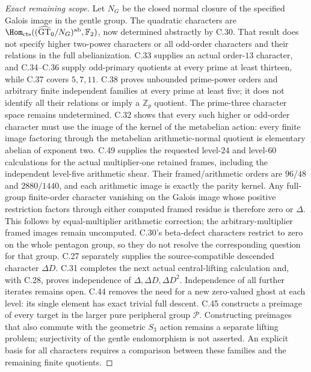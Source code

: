 \begin{proof}[Exact remaining scope]
Let $N_G$ be the closed normal closure of the specified Galois image
in the gentle group. The quadratic characters are
$\Hom_{\mathrm{cts}}((\widehat{\mathrm{GT}}_0/N_G)^{\mathrm{ab}},
\mathbb F_2)$, now determined abstractly by C.30. That result does not
specify higher two-power characters or all odd-order characters and
their relations in the full abelianization. C.33 supplies an actual
order-$13$ character, and C.34--C.36 supply odd-primary quotients
at every prime at least thirteen, while C.37 covers $5,7,11$.
C.38 proves unbounded prime-power orders and arbitrary finite
independent families at every prime at least five; it does not
identify all their relations or imply a $\mathbb Z_p$ quotient.
The prime-three character space remains undetermined.
C.32 shows that every such higher
or odd-order character must use the image of the kernel of
the metabelian action: every finite image factoring through the
metabelian arithmetic-normal quotient is elementary abelian of
exponent two. C.49 supplies the requested level-$24$ and level-$60$
calculations for the actual multiplier-one retained frames, including
the independent level-five arithmetic shear. Their framed/arithmetic
orders are $96/48$ and $2880/1440$, and each arithmetic image is
exactly the parity kernel. Any full-group finite-order character
vanishing on the Galois image whose positive restriction factors
through either computed framed residue is therefore zero or
$\Delta$. This follows by equal-multiplier arithmetic correction;
the arbitrary-multiplier framed images remain uncomputed.
C.30's beta-defect characters
restrict to zero on the whole pentagon group, so they do not resolve
the corresponding question for that group. C.27 separately supplies
the source-compatible descended character $\Delta D$. C.31 completes
the next actual central-lifting calculation and, with C.28, proves
independence of $\Delta,\Delta D,\Delta D^2$. Independence of all
further iterates remains open. C.44 removes the need for a new
zero-valued ghost at each level: its single element has exact
trivial full descent. C.45 constructs a preimage of every target
in the larger pure peripheral group $\mathcal P$. Constructing
preimages that also commute with the geometric $S_3$ action remains
a separate lifting problem; surjectivity of the gentle endomorphism
is not asserted.
An explicit basis for all characters
requires a comparison between these families and the remaining
finite quotients.
\end{proof}

